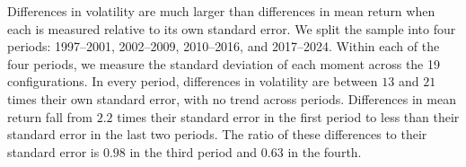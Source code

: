 
Differences in volatility are much larger than differences in mean return when each is measured relative to its own standard error. We split the sample into four periods: 1997--2001, 2002--2009, 2010--2016, and 2017--2024. Within each of the four periods, we measure the standard deviation of each moment across the 19 configurations. In every period, differences in volatility are between $13$ and $21$ times their own standard error, with no trend across periods. Differences in mean return fall from $2.2$ times their standard error in the first period to less than their standard error in the last two periods. The ratio of these differences to their standard error is $0.98$ in the third period and $0.63$ in the fourth.

